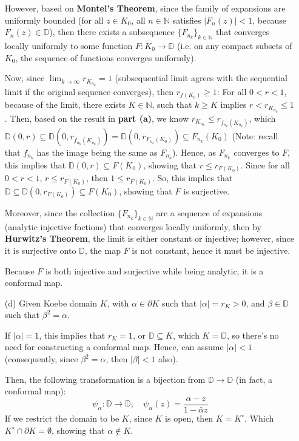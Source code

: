 \documentclass{article}
\begin{document}
\begin{itemize}
    However, based on \textbf{Montel's Theorem}, since the family of expansions are uniformly bounded (for all $z\in K_0$, all $n\in\mathbb{N}$ satisfies $|F_n(z)|<1$, because $F_n(z)\in\mathbb{D}$), then there exists a subsequence $\{F_{n_k}\}_{k\in\mathbb{N}}$ that converges locally uniformly to some function $F:K_0\rightarrow\mathbb{D}$ (i.e. on any compact subsets of $K_0$, the sequence of functions converges uniformly).
    
    Now, since $\lim_{k\rightarrow\infty}r_{K_{n_k}}=1$ (subsequential limit agrees with the sequential limit if the original sequence converges), then $r_{f(K_0)}\geq 1$: For all $0<r<1$, because of the limit, there exists $K\in\mathbb{N}$, such that $k\geq K$ implies $r<r_{K_{n_k}}\leq 1$. Then, based on the result in \textbf{part (a)}, we know $r_{K_{n_k}}\leq r_{f_{n_k}(K_{n_k})}$, which $\mathbb{D}(0,r)\subseteq \mathbb{D}(0,r_{f_{n_k}(K_{n_k})})=\mathbb{D}(0,r_{F_{n_k}(K_0)})\subseteq F_{n_k}(K_0)$ (Note: recall that $f_{n_k}$ has the image being the same as $F_{n_k}$).
    Hence, as $F_{n_k}$ converges to $F$, this implies that $\mathbb{D}(0,r)\subseteq F(K_0)$, showing that $r\leq r_{F(K_0)}$.
    Since for all $0<r<1$, $r\leq r_{F(K_0)}$, then $1\leq r_{F(K_0)}$.
    So, this implies that $\mathbb{D}\subseteq \mathbb{D}(0,r_{F(K_0)})\subseteq F(K_0)$, showing that $F$ is surjective.

    Moreover, since the collection $\{F_{n_k}\}_{k\in\mathbb{N}}$ are a sequence of expansions (analytic injective fnctions) that converges locally uniformly, then by \textbf{Hurwitz's Theorem}, the limit is either constant or injective; however, since it is surjective onto $\mathbb{D}$, the map $F$ is not constant, hence it must be injective.

    Because $F$ is both injective and surjective while being analytic, it is a conformal map. 

    \hfil

    \hfil

    \item[(d)] Given Koebe domain $K$, with $\alpha\in \partial K$ such that $|\alpha|=r_K>0$, and $\beta\in\mathbb{D}$ such that $\beta^2=\alpha$.
    
    If $|\alpha|=1$, this implies that $r_K=1$, or $\mathbb{D}\subseteq K$, which $K=\mathbb{D}$, so there's no need for constructing a conformal map.
    Hence, can assume $|\alpha|<1$ (consequently, since $\beta^2=\alpha$, then $|\beta|<1$ also).

    Then, the following transformation is a bijection from $\mathbb{D}\rightarrow\mathbb{D}$ (in fact, a conformal map):
    $$\psi_\alpha:\mathbb{D}\rightarrow\mathbb{D},\quad \psi_\alpha(z)=\frac{\alpha-z}{1-\bar{\alpha}z}$$
    If we restrict the domain to be $K$, since $K$ is open, then $K=K^\circ$. Which $K^\circ \cap \partial K=\emptyset$, showing that $\alpha\notin K$.


\end{itemize}
\end{document}
